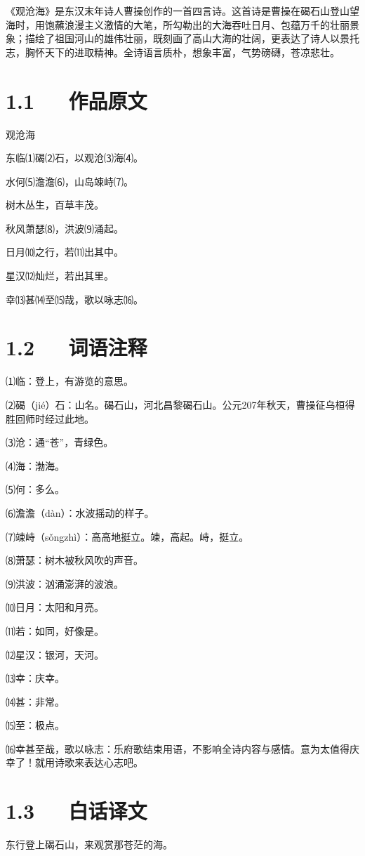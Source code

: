 \documentclass[letterpaper,12pt,english]{sphinxmanual}
\begin{document}
《观沧海》是东汉末年诗人曹操创作的一首四言诗。这首诗是曹操在碣石山登山望海时，用饱蘸浪漫主义激情的大笔，所勾勒出的大海吞吐日月、包蕴万千的壮丽景象；描绘了祖国河山的雄伟壮丽，既刻画了高山大海的壮阔，更表达了诗人以景托志，胸怀天下的进取精神。全诗语言质朴，想象丰富，气势磅礴，苍凉悲壮。


\section{1.1   作品原文}
\label{\detokenize{p01_u6563_u6587/_u66f9_u64cd-_u89c2_u6ca7_u6d77:id3}}
观沧海

东临⑴碣⑵石，以观沧⑶海⑷。

水何⑸澹澹⑹，山岛竦峙⑺。

树木丛生，百草丰茂。

秋风萧瑟⑻，洪波⑼涌起。

日月⑽之行，若⑾出其中。

星汉⑿灿烂，若出其里。

幸⒀甚⒁至⒂哉，歌以咏志⒃。


\section{1.2   词语注释}
\label{\detokenize{p01_u6563_u6587/_u66f9_u64cd-_u89c2_u6ca7_u6d77:id4}}
⑴临：登上，有游览的意思。

⑵碣（jié）石：山名。碣石山，河北昌黎碣石山。公元207年秋天，曹操征乌桓得胜回师时经过此地。

⑶沧：通“苍”，青绿色。

⑷海：渤海。

⑸何：多么。

⑹澹澹（dàn）：水波摇动的样子。

⑺竦峙（sǒngzhì）：高高地挺立。竦，高起。峙，挺立。

⑻萧瑟：树木被秋风吹的声音。

⑼洪波：汹涌澎湃的波浪。

⑽日月：太阳和月亮。

⑾若：如同，好像是。

⑿星汉：银河，天河。

⒀幸：庆幸。

⒁甚：非常。

⒂至：极点。

⒃幸甚至哉，歌以咏志：乐府歌结束用语，不影响全诗内容与感情。意为太值得庆幸了！就用诗歌来表达心志吧。


\section{1.3   白话译文}
\label{\detokenize{p01_u6563_u6587/_u66f9_u64cd-_u89c2_u6ca7_u6d77:id5}}
东行登上碣石山，来观赏那苍茫的海。
\end{document}
